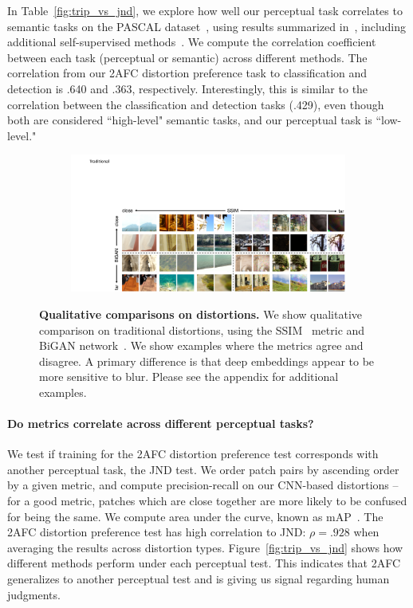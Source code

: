 In Table~\ref{fig:trip_vs_jnd}, we explore how well our perceptual task correlates to semantic tasks on the PASCAL dataset~\cite{pascal-voc-2007}, using results summarized in~\cite{zhang2017split}, including additional self-supervised methods~\cite{agrawal2015learning,pathakCVPR16context,doersch2015unsupervised,wang2015unsupervised,zhang2016colorful,owens2016visually}. We compute the correlation coefficient between each task (perceptual or semantic) across different methods. The correlation from our 2AFC distortion preference task to classification and detection is .640 and .363, respectively. Interestingly, this is similar to the correlation between the classification and detection tasks (.429), even though both are considered ``high-level" semantic tasks, and our perceptual task is ``low-level."

\begin{figure}
\centering
\begin{subfigure}{1.\textwidth}
  \includegraphics[width=1.\linewidth]{imgs/fig_comp_low.pdf}
  \vspace{-5mm}
\end{subfigure}
\caption{\textbf{Qualitative comparisons on distortions.} We show qualitative comparison on traditional distortions, using the SSIM~\cite{wang2004image} metric and BiGAN network~\cite{donahue2016adversarial}. We show examples where the metrics agree and disagree. A primary difference is that deep embeddings appear to be more sensitive to blur. Please see the appendix for additional examples.}
\label{fig:qual_comp}
\vspace{-4mm}
\end{figure}

\paragraph{Do metrics correlate across different perceptual tasks?} We test if training for the 2AFC distortion preference test corresponds with another perceptual task, the JND test. We order patch pairs by ascending order by a given metric, and compute precision-recall on our CNN-based distortions -- for a good metric, patches which are close together are more likely to be confused for being the same. We compute area under the curve, known as mAP~\cite{pascal-voc-2007}. The 2AFC distortion preference test has high correlation to JND: $\rho=.928$ when averaging the results across distortion types. Figure~\ref{fig:trip_vs_jnd} shows how different methods perform under each perceptual test. This indicates that 2AFC generalizes to another perceptual test and is giving us signal regarding human judgments.

